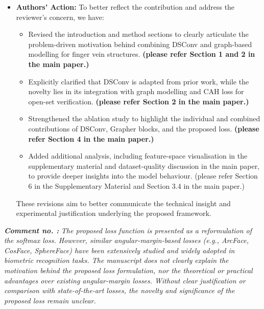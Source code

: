 \documentclass[11pt]{article}
\theoremstyle{remark}
\newcounter{mycounter} %
\newcommand\showReviewcounter{\stepcounter{mycounter}\themycounter}
\begin{document}
\begin{itemize}
\item \textbf{Authors' Action:} 
To better reflect the contribution and address the reviewer’s concern, we have:
\begin{itemize}
    \item Revised the introduction and method sections to clearly articulate the {problem-driven motivation} behind combining DSConv and graph-based modelling for finger vein structures.  \textbf{(please refer Section 1 and 2  in the main paper.)}
    \item Explicitly clarified that DSConv is adapted from prior work, while the novelty lies in its {integration with graph modelling and CAH loss} for open-set verification. \textbf{(please refer Section  2  in the main paper.)}
    \item Strengthened the {ablation study} to highlight the individual and combined contributions of DSConv, Grapher blocks, and the proposed loss. \textbf{(please refer Section 4  in the main paper.)}
    \item Added additional analysis, including feature-space visualisation in the supplementary material and dataset-quality discussion in the main paper, to provide deeper insights into the model behaviour. (please refer Section 6 in the Supplementary Material and Section 3.4 in the main paper.)
\end{itemize}

These revisions aim to better communicate the technical insight and experimental justification underlying the proposed framework.
\end{itemize}
\color{blue} 
\textbf{\textit{Comment no. \showReviewcounter:}} 
\textit{The proposed loss function is presented as a reformulation of the softmax loss. However, similar angular-margin-based losses (e.g., ArcFace, CosFace, SphereFace) have been extensively studied and widely adopted in biometric recognition tasks. The manuscript does not clearly explain the motivation behind the proposed loss formulation, nor the theoretical or practical advantages over existing angular-margin losses. Without clear justification or comparison with state-of-the-art losses, the novelty and significance of the proposed loss remain unclear.}
\color{black}
\end{document}
